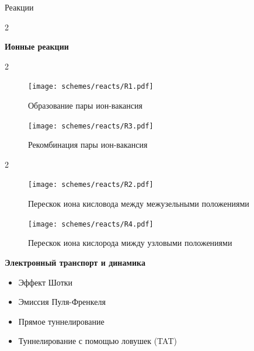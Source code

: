 \documentclass{beamer}%
\begin{document}
\begin{frame} {Реакции}

    \begin {multicols} {2}

    \textbf{Ионные реакции}
    \begin {multicols} {2}
    \begin{figure}
        
        \centering
        \texttt{[image: schemes/reacts/R1.pdf]}
        \caption{Образование пары ион-вакансия}
        
    \end{figure}

    \columnbreak
    \begin{figure}

        \centering
        \texttt{[image: schemes/reacts/R3.pdf]}
        \caption{Рекомбинация пары ион-вакансия}

    \end{figure}

    \end{multicols}

    \begin {multicols} {2}
        
    \begin{figure}

        \centering
        \texttt{[image: schemes/reacts/R2.pdf]}
        \caption{Перескок иона кисловода между межузельными положениями}

    \end{figure}
    \columnbreak
    \begin{figure}

        \centering
        \texttt{[image: schemes/reacts/R4.pdf]}
        \caption{Перескок иона кислорода мижду узловыми положениями}

    \end{figure}
    \end{multicols}

    \columnbreak

    \textbf{Электронный транспорт и динамика}
    \begin{itemize}
        \item Эффект Шотки
        \item Эмиссия Пуля-Френкеля
        \item Прямое туннелирование
        \item Туннелирование с помощью ловушек (TAT)
    \end{itemize}

    \end{multicols}
\end{frame}
\end{document}
